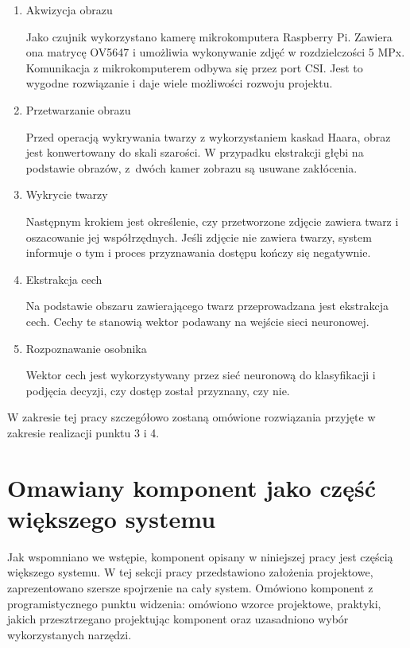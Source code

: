\documentclass[oneside, eng]{mgr}
\begin{document}
\begin{enumerate}

\item Akwizycja obrazu
	
Jako czujnik wykorzystano kamerę mikrokomputera Raspberry Pi. Zawiera ona matrycę OV5647 i umożliwia wykonywanie zdjęć w rozdzielczości 5 MPx. Komunikacja z mikrokomputerem odbywa się przez port CSI. Jest to wygodne rozwiązanie i daje wiele możliwości rozwoju projektu. 
	
\item Przetwarzanie obrazu

Przed operacją wykrywania twarzy z wykorzystaniem kaskad Haara, obraz jest konwertowany do skali szarości. W przypadku ekstrakcji głębi na podstawie obrazów, z~dwóch kamer zobrazu są usuwane zakłócenia.

\item Wykrycie twarzy

Następnym krokiem jest określenie, czy przetworzone zdjęcie zawiera twarz i oszacowanie jej współrzędnych. Jeśli zdjęcie nie zawiera twarzy, system informuje o tym i proces przyznawania dostępu kończy się negatywnie.

\item Ekstrakcja cech

Na podstawie obszaru zawierającego twarz przeprowadzana jest ekstrakcja cech. Cechy te stanowią wektor podawany na wejście sieci neuronowej.

\item Rozpoznawanie osobnika

Wektor cech jest wykorzystywany przez sieć neuronową do klasyfikacji i podjęcia decyzji, czy dostęp został przyznany, czy nie.

\end{enumerate} 

W zakresie tej pracy szczegółowo zostaną omówione rozwiązania przyjęte w zakresie realizacji punktu 3 i 4. 



\section{Omawiany komponent jako część większego systemu} 

Jak wspomniano we wstępie, komponent opisany w niniejszej pracy jest częścią większego systemu. W tej sekcji pracy przedstawiono założenia projektowe, zaprezentowano szersze spojrzenie na cały system. Omówiono komponent z programistycznego punktu widzenia: omówiono wzorce projektowe, praktyki, jakich przesztrzegano projektując komponent oraz uzasadniono wybór wykorzystanych narzędzi.
\end{document}
